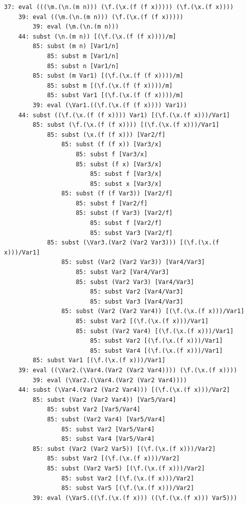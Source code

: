 \documentclass{article}
\theoremstyle{theorem}
\theoremstyle{definition}
\theoremstyle{remark}
\begin{document}
\begin{verbatim}
37: eval (((\m.(\n.(m n))) (\f.(\x.(f (f x))))) (\f.(\x.(f x))))
    39: eval ((\m.(\n.(m n))) (\f.(\x.(f (f x)))))
        39: eval (\m.(\n.(m n)))
    44: subst (\n.(m n)) [(\f.(\x.(f (f x))))/m]
        85: subst (m n) [Var1/n]
            85: subst m [Var1/n]
            85: subst n [Var1/n]
        85: subst (m Var1) [(\f.(\x.(f (f x))))/m]
            85: subst m [(\f.(\x.(f (f x))))/m]
            85: subst Var1 [(\f.(\x.(f (f x))))/m]
        39: eval (\Var1.((\f.(\x.(f (f x)))) Var1))
    44: subst ((\f.(\x.(f (f x)))) Var1) [(\f.(\x.(f x)))/Var1]
        85: subst (\f.(\x.(f (f x)))) [(\f.(\x.(f x)))/Var1]
            85: subst (\x.(f (f x))) [Var2/f]
                85: subst (f (f x)) [Var3/x]
                    85: subst f [Var3/x]
                    85: subst (f x) [Var3/x]
                        85: subst f [Var3/x]
                        85: subst x [Var3/x]
                85: subst (f (f Var3)) [Var2/f]
                    85: subst f [Var2/f]
                    85: subst (f Var3) [Var2/f]
                        85: subst f [Var2/f]
                        85: subst Var3 [Var2/f]
            85: subst (\Var3.(Var2 (Var2 Var3))) [(\f.(\x.(f x)))/Var1]
                85: subst (Var2 (Var2 Var3)) [Var4/Var3]
                    85: subst Var2 [Var4/Var3]
                    85: subst (Var2 Var3) [Var4/Var3]
                        85: subst Var2 [Var4/Var3]
                        85: subst Var3 [Var4/Var3]
                85: subst (Var2 (Var2 Var4)) [(\f.(\x.(f x)))/Var1]
                    85: subst Var2 [(\f.(\x.(f x)))/Var1]
                    85: subst (Var2 Var4) [(\f.(\x.(f x)))/Var1]
                        85: subst Var2 [(\f.(\x.(f x)))/Var1]
                        85: subst Var4 [(\f.(\x.(f x)))/Var1]
        85: subst Var1 [(\f.(\x.(f x)))/Var1]
    39: eval ((\Var2.(\Var4.(Var2 (Var2 Var4)))) (\f.(\x.(f x))))
        39: eval (\Var2.(\Var4.(Var2 (Var2 Var4))))
    44: subst (\Var4.(Var2 (Var2 Var4))) [(\f.(\x.(f x)))/Var2]
        85: subst (Var2 (Var2 Var4)) [Var5/Var4]
            85: subst Var2 [Var5/Var4]
            85: subst (Var2 Var4) [Var5/Var4]
                85: subst Var2 [Var5/Var4]
                85: subst Var4 [Var5/Var4]
        85: subst (Var2 (Var2 Var5)) [(\f.(\x.(f x)))/Var2]
            85: subst Var2 [(\f.(\x.(f x)))/Var2]
            85: subst (Var2 Var5) [(\f.(\x.(f x)))/Var2]
                85: subst Var2 [(\f.(\x.(f x)))/Var2]
                85: subst Var5 [(\f.(\x.(f x)))/Var2]
        39: eval (\Var5.((\f.(\x.(f x))) ((\f.(\x.(f x))) Var5)))
\end{verbatim}
\end{document}
